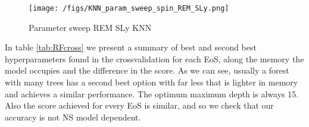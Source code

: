 \begin{figure}
\centering
\texttt{[image: /figs/KNN\_param\_sweep\_spin\_REM\_SLy.png]}
\caption{\label{fig:KNN_paramsweep_REM_SLY} Parameter sweep REM SLy KNN}
\end{figure}





In table \ref{tab:RFcross} we present a summary of best and second best hyperparameters found in the crossvalidation for each EoS, along the memory the model occupies and the difference in the score. As we can see, usually a forest with many trees has a second best option with far less that is lighter in memory and achieves a similar performance. The optimum maximum depth is always 15. Also the score achieved for every EoS is similar, and so we check that our accuracy is not NS model dependent.


